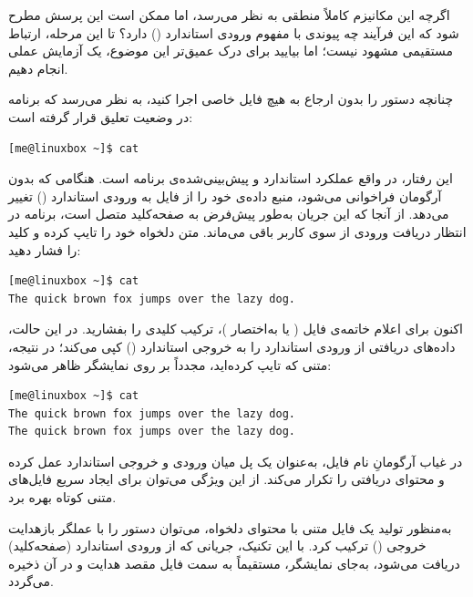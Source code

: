 اگرچه این مکانیزم کاملاً منطقی به نظر می‌رسد، اما ممکن است این پرسش مطرح شود که این فرآیند چه پیوندی با مفهوم ورودی استاندارد () دارد؟ تا این مرحله، ارتباط مستقیمی مشهود نیست؛ اما بیایید برای درک عمیق‌تر این موضوع، یک آزمایش عملی انجام دهیم.

چنانچه دستور  را بدون ارجاع به هیچ فایل خاصی اجرا کنید، به نظر می‌رسد که برنامه در وضعیت تعلیق قرار گرفته است:

\begin{latin}
\begin{lstlisting}
[me@linuxbox ~]$ cat

\end{lstlisting}
\end{latin}

این رفتار، در واقع عملکرد استاندارد و پیش‌بینی‌شده‌ی برنامه است. هنگامی که  بدون آرگومان فراخوانی می‌شود، منبع داده‌ی خود را از فایل به ورودی استاندارد () تغییر می‌دهد. از آنجا که این جریان به‌طور پیش‌فرض به صفحه‌کلید متصل است، برنامه در انتظار دریافت ورودی از سوی کاربر باقی می‌ماند. متن دلخواه خود را تایپ کرده و کلید  را فشار دهید:

\begin{latin}
\begin{lstlisting}
[me@linuxbox ~]$ cat
The quick brown fox jumps over the lazy dog.
\end{lstlisting}
\end{latin}

اکنون برای اعلام خاتمه‌ی فایل ( یا به‌اختصار )، ترکیب کلیدی  را بفشارید. در این حالت،  داده‌های دریافتی از ورودی استاندارد را به خروجی استاندارد () کپی می‌کند؛ در نتیجه، متنی که تایپ کرده‌اید، مجدداً بر روی نمایشگر ظاهر می‌شود:

\begin{latin}
\begin{lstlisting}
[me@linuxbox ~]$ cat
The quick brown fox jumps over the lazy dog.
The quick brown fox jumps over the lazy dog.
\end{lstlisting}
\end{latin}

در غیاب آرگومانِ نام فایل،  به‌عنوان یک پل میان ورودی و خروجی استاندارد عمل کرده و محتوای دریافتی را تکرار می‌کند. از این ویژگی می‌توان برای ایجاد سریع فایل‌های متنی کوتاه بهره برد.

به‌منظور تولید یک فایل متنی با محتوای دلخواه، می‌توان دستور  را با عملگر بازهدایت خروجی (\cmd{>}) ترکیب کرد. با این تکنیک، جریانی که از ورودی استاندارد (صفحه‌کلید) دریافت می‌شود، به‌جای نمایشگر، مستقیماً به سمت فایل مقصد هدایت و در آن ذخیره می‌گردد.

